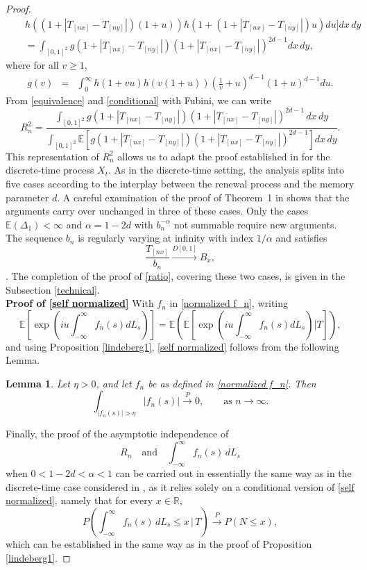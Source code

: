 \documentclass[preprint,12pt]{article}
\newtheorem{lem}{Lemma}
\begin{document}
\begin{proof}
\begin{eqnarray}
&&h\left((1+|T_{[nx]}-T_{[ny]}|)(1+u)\right)h\left(1+(1+|T_{[nx]}-T_{[ny]}|)u\right)
du
\Bigg]dx\,dy\nonumber\\
&&=\int_{[0,1]^2}g(1+|T_{[nx]}-T_{[ny]}|)(1+|T_{[nx]}-T_{[ny]}|)^{2d-1}dx\,dy,
\end{eqnarray}
where for all $v\ge1$, 
\begin{eqnarray}\label{finite d}
g(v)&=&\int_0^\infty h(1+vu)h(v(1+u))\left(\frac{1}{v}+u\right)^{d-1}(1+u)^{d-1}du.
\end{eqnarray}
From \eqref{equivalence} and \eqref{conditional} with Fubini, we can write
$$
R_n^2
=
\frac{
\displaystyle\int_{[0,1]^2}
g(1+|T_{[nx]}-T_{[ny]}|)(1+|T_{[nx]}-T_{[ny]}|)^{2d-1}\,dx\,dy
}{
\displaystyle\int_{[0,1]^2}
\mathbb{E}
\left[g(1+|T_{[nx]}-T_{[ny]}|)
(1+|T_{[nx]}-T_{[ny]}|)^{2d-1}
\right]dx\,dy
}.
$$
This representation of $R_n^2$ allows us to adapt the proof established in
\cite{ouldhaye2024asymptoticsirregularlyobservedlong} for the discrete-time
process $X_t$. As in the discrete-time setting, the analysis splits
into five cases according to the interplay between the renewal process and the memory parameter $d$.
A careful examination of the proof of Theorem~1 in
\cite{ouldhaye2024asymptoticsirregularlyobservedlong} shows that the arguments
carry over unchanged in three of these cases. Only the cases
$\mathbb{E}(\Delta_1)<\infty$ and $\alpha=1-2d$ with
$b_n^{-\alpha}$ not summable require new arguments. The sequence $b_n$  is regularly varying at infinity  with index $1/\alpha$ and satisfies
$$
\frac{T_{[nx]}}{b_n}
\overset{D[0,1]}{\longrightarrow}
B_x,
$$
\cite[see for example][Ch. 7, Corollary 7.1 and page 247] {resnick2007heavy}. The completion of the  proof of \eqref{ratio}, covering these two  cases, is given in the Subsection \ref{technical}. \\
\medskip
{\boldmath\textbf{Proof of \eqref{self normalized}}}
With $f_n$ in \eqref{normalized f_n}, writing 
$$
\mathbb{E}\left[\exp\left(iu\int_{-\infty}^\infty f_n(s)dL_s\right)\right]=\mathbb{E}\left(\mathbb{E}\left[\exp\left(iu\int_{-\infty}^\infty f_n(s)dL_s\right)\Bigg\vert T\right]\right),
$$
and using Proposition \ref{lindeberg1}, \eqref{self normalized} follows from the following Lemma.
\begin{lem}\label{in proba con}
Let $\eta>0$, and  let $f_n$ be as defined in \eqref{normalized f_n}. Then
    \begin{equation}\label{unif fn}
\int_{\vert f_n(s)\vert>\eta}\vert f_n(s)\vert
\overset{P}{\to}0,\qquad\textrm{as }n\to\infty.
\end{equation}
\end{lem}
Finally, the proof of the asymptotic independence of
\[
R_n \quad \text{and} \quad \int_{-\infty}^{\infty} f_n(s)\,dL_s
\]
when \(0<1-2d<\alpha<1\) can be carried out in essentially the same way as in the discrete-time case considered in \cite{ouldhaye2024asymptoticsirregularlyobservedlong}, as it relies solely on a conditional version of \eqref{self normalized}, namely that for every \(x\in\mathbb{R}\),
\[
P\left(\int_{-\infty}^{\infty} f_n(s)\,dL_s \le x \,\Big|\, T\right)
\overset{P}{\longrightarrow}
P(N\le x),
\]
which can be established  in the same way as in the proof of Proposition \ref{lindeberg1}.
\end{proof}
\end{document}
